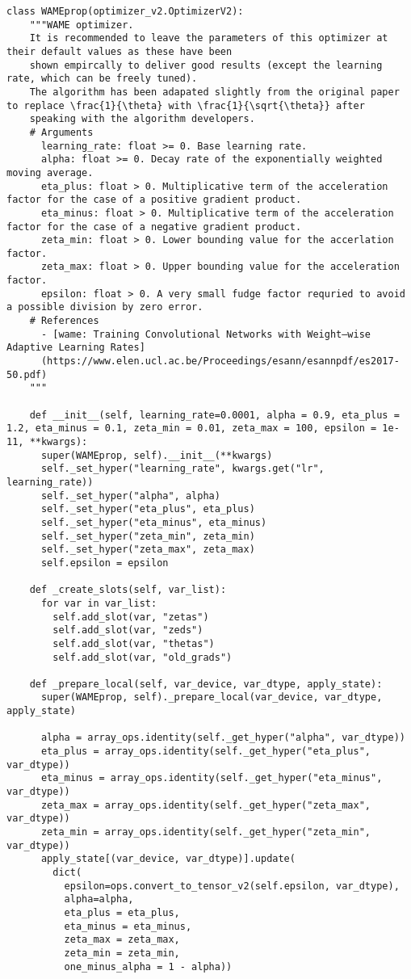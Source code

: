 \documentclass[12pt]{article}
\numberwithin{equation}{section}
\numberwithin{figure}{section}
\numberwithin{table}{section}
\begin{document}
\begin{lstlisting}[caption = {WAME class implementation}, label ={code:wameclass}]
  class WAMEprop(optimizer_v2.OptimizerV2):
    """WAME optimizer.
    It is recommended to leave the parameters of this optimizer at their default values as these have been
    shown empircally to deliver good results (except the learning rate, which can be freely tuned).
    The algorithm has been adapated slightly from the original paper to replace \frac{1}{\theta} with \frac{1}{\sqrt{\theta}} after 
    speaking with the algorithm developers. 
    # Arguments
      learning_rate: float >= 0. Base learning rate.
      alpha: float >= 0. Decay rate of the exponentially weighted moving average.
      eta_plus: float > 0. Multiplicative term of the acceleration factor for the case of a positive gradient product.
      eta_minus: float > 0. Multiplicative term of the acceleration factor for the case of a negative gradient product.
      zeta_min: float > 0. Lower bounding value for the accerlation factor.
      zeta_max: float > 0. Upper bounding value for the acceleration factor.
      epsilon: float > 0. A very small fudge factor requried to avoid a possible division by zero error.
    # References
      - [wame: Training Convolutional Networks with Weight–wise Adaptive Learning Rates]
      (https://www.elen.ucl.ac.be/Proceedings/esann/esannpdf/es2017-50.pdf)
    """
  
    def __init__(self, learning_rate=0.0001, alpha = 0.9, eta_plus = 1.2, eta_minus = 0.1, zeta_min = 0.01, zeta_max = 100, epsilon = 1e-11, **kwargs):
      super(WAMEprop, self).__init__(**kwargs)
      self._set_hyper("learning_rate", kwargs.get("lr", learning_rate))
      self._set_hyper("alpha", alpha)
      self._set_hyper("eta_plus", eta_plus)
      self._set_hyper("eta_minus", eta_minus)
      self._set_hyper("zeta_min", zeta_min)
      self._set_hyper("zeta_max", zeta_max)
      self.epsilon = epsilon
   
    def _create_slots(self, var_list):
      for var in var_list:
        self.add_slot(var, "zetas")
        self.add_slot(var, "zeds")
        self.add_slot(var, "thetas")
        self.add_slot(var, "old_grads")
  
    def _prepare_local(self, var_device, var_dtype, apply_state):
      super(WAMEprop, self)._prepare_local(var_device, var_dtype, apply_state)
  
      alpha = array_ops.identity(self._get_hyper("alpha", var_dtype))
      eta_plus = array_ops.identity(self._get_hyper("eta_plus", var_dtype))
      eta_minus = array_ops.identity(self._get_hyper("eta_minus", var_dtype))
      zeta_max = array_ops.identity(self._get_hyper("zeta_max", var_dtype))
      zeta_min = array_ops.identity(self._get_hyper("zeta_min", var_dtype))
      apply_state[(var_device, var_dtype)].update(
        dict(
          epsilon=ops.convert_to_tensor_v2(self.epsilon, var_dtype),
          alpha=alpha,
          eta_plus = eta_plus,
          eta_minus = eta_minus,
          zeta_max = zeta_max,
          zeta_min = zeta_min,
          one_minus_alpha = 1 - alpha))
  

\end{lstlisting}
\end{document}
